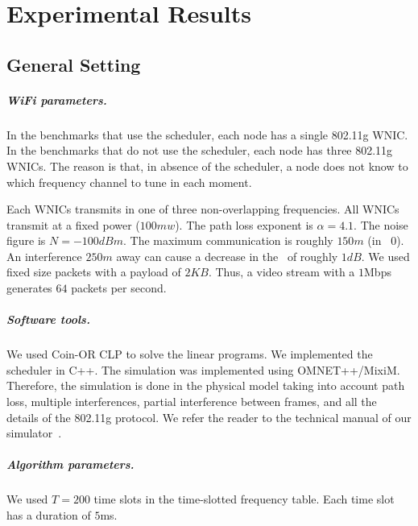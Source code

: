 \documentclass[12pt,oneside,english,a4paper]{book}
\theoremstyle{plain}
\theoremstyle{definition}
\theoremstyle{Theorem}
\theoremstyle{plain}
\newenvironment{proof sketch}[1]{\noindent {\emph{Proof sketch of #1:}}}{\hfill \qed}
\newcommand{\SINR}{\text{\sc{sinr}}}
\newcommand{\MCS}{\text{\sc{mcs}}}
\begin{document}
\chapter{Experimental Results}

\section{General Setting}\label{sec:exp}


\paragraph{WiFi parameters.}  In the benchmarks that use the scheduler,
each node has a single 802.11g WNIC.  In the benchmarks that do not
use the scheduler, each node has three 802.11g WNICs.  The reason is
that, in absence of the scheduler, a node does not know to which
frequency channel to tune in each moment.

 Each WNICs transmits in one of three
non-overlapping frequencies.  All WNICs transmit at a fixed power
($100mw$). The path loss exponent is $\alpha=4.1$. The noise figure
is $N=-100dBm$. The maximum communication is roughly $150m$ (in \MCS\
$0$). An interference $250m$ away can cause a decrease in the \SINR\
of roughly $1dB$. We used fixed size packets with a payload of $2KB$.
Thus, a video stream with a $1$Mbps generates $64$ packets per second.



\paragraph{Software tools.}  We used Coin-OR CLP to solve the linear
programs.  We implemented the scheduler in C++.  The simulation was
implemented using OMNET++/MixiM. Therefore, the simulation is done in
the physical model taking into account path loss, multiple
interferences, partial interference between frames, and all the
details of the 802.11g protocol.
We refer the reader to the technical manual of our simulator~\cite{YF}.
\paragraph{Algorithm parameters.} We used $T=200$ time slots in the
time-slotted frequency table.  Each time slot has a duration of $5$ms.
\end{document}
